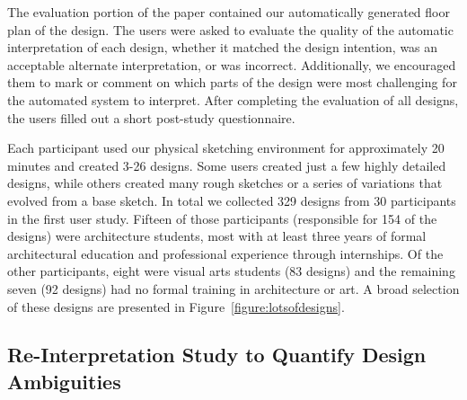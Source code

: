 The evaluation portion of the paper contained our automatically
generated floor plan of the design.  The users were asked to evaluate
the quality of the automatic interpretation of each design, whether
it matched the design intention, was an acceptable alternate
interpretation, or was incorrect.
Additionally, we encouraged them to mark or comment on which parts of
the design were most challenging for the automated system to
interpret.  After completing the evaluation of all designs, the users
filled out a short post-study questionnaire.



Each participant used our physical sketching environment for approximately
20 minutes and created 3-26 designs.  Some users created just
a few highly detailed designs, while others created many rough sketches or
a series of variations that evolved from a base sketch.  In total we
collected 329 designs from 30 participants in the first user study.
Fifteen of those participants (responsible for 154 of the designs) were
architecture students, most with at least three years of formal
architectural education and professional experience through
internships. 
Of the other participants, eight were visual arts students (83 designs) and
the remaining seven (92 designs) had no formal training in architecture or
art.  A broad selection of these designs are presented in
Figure~\ref{figure:lotsofdesigns}.


\subsection{Re-Interpretation Study to Quantify Design Ambiguities}

